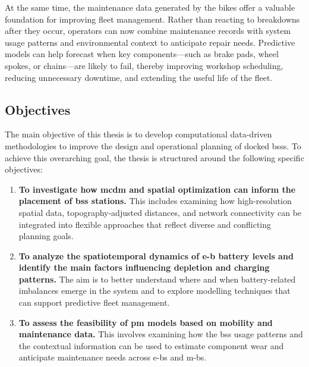 At the same time, the maintenance data generated by the bikes offer a valuable foundation for improving fleet management. Rather than reacting to breakdowns after they occur, operators can now combine maintenance records with system usage patterns and environmental context to anticipate repair needs. Predictive models can help forecast when key components—such as brake pads, wheel spokes, or chains—are likely to fail, thereby improving workshop scheduling, reducing unnecessary downtime, and extending the useful life of the fleet.


\subsection{Objectives}

The main objective of this thesis is to develop computational data-driven methodologies to improve the design and operational planning of docked \acp{bss}. To achieve this overarching goal, the thesis is structured around the following specific objectives:

\begin{enumerate}
    \item \textbf{To investigate how \ac{mcdm} and spatial optimization can inform the placement of \ac{bss} stations.}  
    This includes examining how high-resolution spatial data, topography-adjusted distances, and network connectivity can be integrated into flexible approaches that reflect diverse and conflicting planning goals.

    \item \textbf{To analyze the spatiotemporal dynamics of \ac{e-b} battery levels and identify the main factors influencing depletion and charging patterns.}
    The aim is to better understand where and when battery-related imbalances emerge in the system and to explore modelling techniques that can support predictive fleet management.

    \item \textbf{To assess the feasibility of \ac{pm} models based on mobility and maintenance data.}  
    This involves examining how the \ac{bss} usage patterns and the contextual information can be used to estimate component wear and anticipate maintenance needs across \acp{e-b} and \acp{m-b}.
\end{enumerate}






